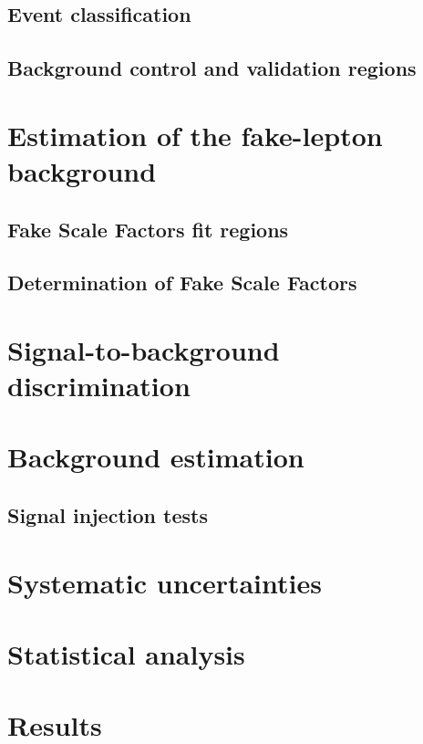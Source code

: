 \clearpage
\subsection{Event classification}

\clearpage
\subsection{Background control and validation regions}

\clearpage
\section{Estimation of the fake-lepton background}

\clearpage
\subsection{Fake Scale Factors fit regions} 
\subsection{Determination of Fake Scale Factors}
	
\clearpage
\section{Signal-to-background discrimination}

\clearpage
\section{Background estimation}

\clearpage
\subsection{Signal injection tests}

\clearpage
\section{Systematic uncertainties}

\clearpage
\section{Statistical analysis}

\clearpage
\section{Results}
\clearpage


